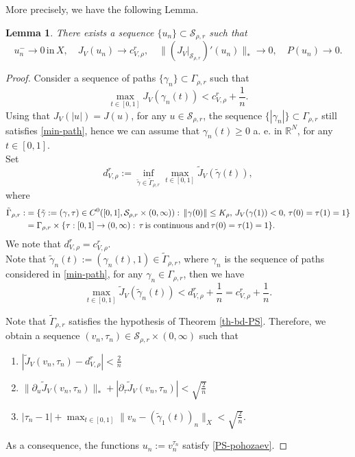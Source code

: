 \documentclass[11pt,reqno]{amsart}
\newtheorem{lemma}[theorem]{Lemma}
\theoremstyle{definition}
\numberwithin{equation}{section}
\numberwithin{theorem}{section}
\numberwithin{equation}{section}
\numberwithin{theorem}{section}
\newcommand{\R}{\mathbb{R}}
\begin{document}
More precisely, we have the following Lemma.
\begin{lemma}\label{lemma-bdPS}
There exists a sequence $\{u_n\}\subset \mathcal{S}_{\rho,r}$ such that
\begin{equation}\label{PS-pohozaev}
u_n^-\to 0 \,\text{in}\,X,\quad J_V(u_n)\to c^r_{V,\rho},\quad \|(J_V|_{\mathcal{S}_{\rho,r}})'(u_n)\|_*\to 0,\quad P(u_n)\to 0.
\end{equation}
\end{lemma}
\begin{proof}
Consider a sequence of paths $\{\gamma_n\}\subset\Gamma_{\rho,r}$ such that
\begin{equation}
\label{min-path}
\max_{t\in[0,1]}J_V(\gamma_n(t))<c^r_{V,\rho}+\frac{1}{n}.    
\end{equation}
Using that $J_V(|u|)=J(u)$, for any $u\in \mathcal{S}_{\rho,r}$, the sequence $\{|\gamma_n|\}\subset \Gamma_{\rho,r}$ still satisfies \eqref{min-path}, hence we can assume that $\gamma_n(t)\ge 0$ a. e. in $\R^N$, for any $t\in[0,1]$.\\

Set
$$d^r_{V,\rho}:=\inf_{\tilde{\gamma}\in\tilde{\Gamma}_{\rho,r}}\max_{t\in[0,1]}\tilde{J}_V(\tilde{\gamma}(t)),$$
where
\begin{equation}\notag
\begin{aligned}
\tilde{\Gamma}_{\rho,r}:&=\{\tilde{\gamma}:=(\gamma,\tau)\in C^0([0,1],\mathcal{S}_{\rho,r}\times(0,\infty)):\,\|\gamma(0)\|\le K_\rho,\,J_V(\gamma(1))<0,\,\tau(0)=\tau(1)=1\}\\
&=\Gamma_{\rho,r}\times\{\tau:[0,1]\to(0,\infty):\,\tau\,\text{is continuous and}\,\tau(0)=\tau(1)=1\}.     
\end{aligned}
\end{equation}
We note that $d^r_{V,\rho}=c^r_{V,\rho}$.\\

Note that $\tilde{\gamma}_n(t):=(\gamma_n(t),1)\in\tilde{\Gamma}_{\rho,r}$, where $\gamma_n$ is the sequence of paths considered in \eqref{min-path}, for any $\gamma_n\in \Gamma_{\rho,r}$, then we have
\begin{equation}
\label{min-path}
\max_{t\in[0,1]}\tilde{J}_V(\tilde{\gamma}_n(t))<d^r_{V,\rho}+\frac{1}{n}=c^r_{V,\rho}+\frac{1}{n}.    
\end{equation}


Note that $\tilde{\Gamma}_{\rho,r}$ satisfies the hypothesis of Theorem \ref{th-bd-PS}. Therefore, we obtain a sequence $(v_n,\tau_n)\in\mathcal{S}_{\rho,r}\times (0,\infty)$ such that
\begin{enumerate}
    \item $|\tilde{J}_V(v_n,\tau_n)-d^r_{V,\rho}|<\frac{2}{n}$
    \item $\|\partial_u\tilde{J}_V(v_n,\tau_n)\|_*+|\partial_\tau\tilde{J}_V(v_n,\tau_n)|<\sqrt{\frac{2}{n}}$
    \item $|\tau_n-1|+\max_{t\in[0,1]}\|v_n-(\tilde{\gamma}_1(t))_n\|_X<\sqrt{\frac{2}{n}}$.
\end{enumerate}
As a consequence, the functions $u_n:=v_n^{\tau_n}$ satisfy \eqref{PS-pohozaev}.
\end{proof}
\end{document}
